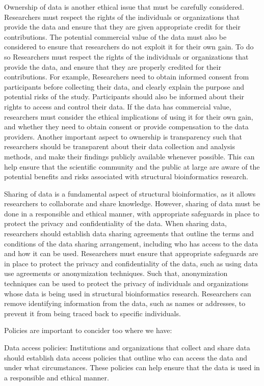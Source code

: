 \documentclass[]{final_report}
\begin{document}
Ownership of data is another ethical issue that must be carefully considered. Researchers must respect the rights of the individuals or organizations that provide the data and ensure that they are given appropriate credit for their contributions. The potential commercial value of the data must also be considered to ensure that researchers do not exploit it for their own gain. To do so Researchers must respect the rights of the individuals or organizations that provide the data, and ensure that they are properly credited for their contributions. For example, Researchers need to obtain informed consent from participants before collecting their data, and clearly explain the purpose and potential risks of the study. Participants should also be informed about their rights to access and control their data. If the data has commercial value, researchers must consider the ethical implications of using it for their own gain, and whether they need to obtain consent or provide compensation to the data providers. Another important aspect to ownership is transparency such that researchers should be transparent about their data collection and analysis methods, and make their findings publicly available whenever possible. This can help ensure that the scientific community and the public at large are aware of the potential benefits and risks associated with structural bioinformatics research.

Sharing of data is a fundamental aspect of structural bioinformatics, as it allows researchers to collaborate and share knowledge. However, sharing of data must be done in a responsible and ethical manner, with appropriate safeguards in place to protect the privacy and confidentiality of the data. When sharing data, researchers should establish data sharing agreements that outline the terms and conditions of the data sharing arrangement, including who has access to the data and how it can be used. Researchers must ensure that appropriate safeguards are in place to protect the privacy and confidentiality of the data, such as using data use agreements or anonymization techniques. Such that, anonymization techniques can be used to protect the privacy of individuals and organizations whose data is being used in structural bioinformatics research. Researchers can remove identifying information from the data, such as names or addresses, to prevent it from being traced back to specific individuals.

Policies are important to concider too where we have:

Data access policies: Institutions and organizations that collect and share data should establish data access policies that outline who can access the data and under what circumstances. These policies can help ensure that the data is used in a responsible and ethical manner.
\end{document}
